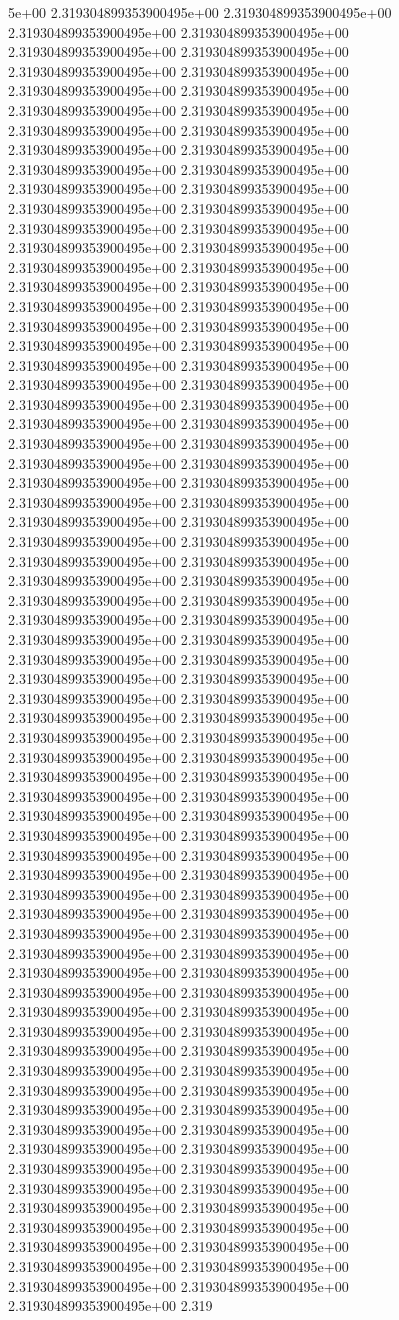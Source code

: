 5e+00	2.319304899353900495e+00	2.319304899353900495e+00	2.319304899353900495e+00	2.319304899353900495e+00	2.319304899353900495e+00	2.319304899353900495e+00	2.319304899353900495e+00	2.319304899353900495e+00	2.319304899353900495e+00	2.319304899353900495e+00	2.319304899353900495e+00	2.319304899353900495e+00	2.319304899353900495e+00	2.319304899353900495e+00	2.319304899353900495e+00	2.319304899353900495e+00	2.319304899353900495e+00	2.319304899353900495e+00	2.319304899353900495e+00	2.319304899353900495e+00	2.319304899353900495e+00	2.319304899353900495e+00	2.319304899353900495e+00	2.319304899353900495e+00	2.319304899353900495e+00	2.319304899353900495e+00	2.319304899353900495e+00	2.319304899353900495e+00	2.319304899353900495e+00	2.319304899353900495e+00	2.319304899353900495e+00	2.319304899353900495e+00	2.319304899353900495e+00	2.319304899353900495e+00	2.319304899353900495e+00	2.319304899353900495e+00	2.319304899353900495e+00	2.319304899353900495e+00	2.319304899353900495e+00	2.319304899353900495e+00	2.319304899353900495e+00	2.319304899353900495e+00	2.319304899353900495e+00	2.319304899353900495e+00	2.319304899353900495e+00	2.319304899353900495e+00	2.319304899353900495e+00	2.319304899353900495e+00	2.319304899353900495e+00	2.319304899353900495e+00	2.319304899353900495e+00	2.319304899353900495e+00	2.319304899353900495e+00	2.319304899353900495e+00	2.319304899353900495e+00	2.319304899353900495e+00	2.319304899353900495e+00	2.319304899353900495e+00	2.319304899353900495e+00	2.319304899353900495e+00	2.319304899353900495e+00	2.319304899353900495e+00	2.319304899353900495e+00	2.319304899353900495e+00	2.319304899353900495e+00	2.319304899353900495e+00	2.319304899353900495e+00	2.319304899353900495e+00	2.319304899353900495e+00	2.319304899353900495e+00	2.319304899353900495e+00	2.319304899353900495e+00	2.319304899353900495e+00	2.319304899353900495e+00	2.319304899353900495e+00	2.319304899353900495e+00	2.319304899353900495e+00	2.319304899353900495e+00	2.319304899353900495e+00	2.319304899353900495e+00	2.319304899353900495e+00	2.319304899353900495e+00	2.319304899353900495e+00	2.319304899353900495e+00	2.319304899353900495e+00	2.319304899353900495e+00	2.319304899353900495e+00	2.319304899353900495e+00	2.319304899353900495e+00	2.319304899353900495e+00	2.319304899353900495e+00	2.319304899353900495e+00	2.319304899353900495e+00	2.319304899353900495e+00	2.319304899353900495e+00	2.319304899353900495e+00	2.319304899353900495e+00	2.319304899353900495e+00	2.319304899353900495e+00	2.319304899353900495e+00	2.319304899353900495e+00	2.319304899353900495e+00	2.319304899353900495e+00	2.319304899353900495e+00	2.319304899353900495e+00	2.319304899353900495e+00	2.319304899353900495e+00	2.319304899353900495e+00	2.319304899353900495e+00	2.319304899353900495e+00	2.319304899353900495e+00	2.319304899353900495e+00	2.319304899353900495e+00	2.319304899353900495e+00	2.319304899353900495e+00	2.319304899353900495e+00	2.319304899353900495e+00	2.319304899353900495e+00	2.319304899353900495e+00	2.319304899353900495e+00	2.319304899353900495e+00	2.319304899353900495e+00	2.319304899353900495e+00	2.319304899353900495e+00	2.319304899353900495e+00	2.319304899353900495e+00	2.319304899353900495e+00	2.319304899353900495e+00	2.319304899353900495e+00	2.319304899353900495e+00	2.319304899353900495e+00	2.319304899353900495e+00	2.319304899353900495e+00	2.319